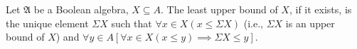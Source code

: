 Let $\mathfrak{A}$ be a Boolean algebra, $X \subseteq A$. The least upper bound of $X$, if it exists, is the unique element $\Sigma X$ such that $\forall x \in X (x \leq \Sigma X)$ (i.e., $\Sigma X$ is an upper bound of $X$) and $\forall y \in A [\forall x \in X (x \leq y) \implies \Sigma X \leq y]$.
